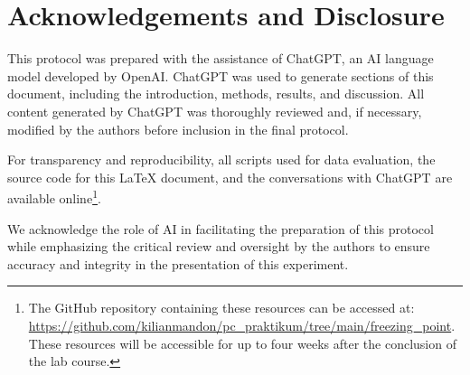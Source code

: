 \documentclass[a4paper,12pt]{article}
\begin{document}
\section{Acknowledgements and Disclosure}
This protocol was prepared with the assistance of ChatGPT, an AI language model developed by OpenAI. ChatGPT was used to generate sections of this document, including the introduction, methods, results, and discussion. All content generated by ChatGPT was thoroughly reviewed and, if necessary, modified by the authors before inclusion in the final protocol.

For transparency and reproducibility, all scripts used for data evaluation, the source code for this LaTeX document, and the conversations with ChatGPT are available online\footnote{The GitHub repository containing these resources can be accessed at: \url{https://github.com/kilianmandon/pc_praktikum/tree/main/freezing_point}. These resources will be accessible for up to four weeks after the conclusion of the lab course.}.

We acknowledge the role of AI in facilitating the preparation of this protocol while emphasizing the critical review and oversight by the authors to ensure accuracy and integrity in the presentation of this experiment.
\end{document}
